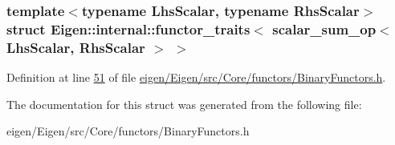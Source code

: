 \subsubsection*{template$<$typename Lhs\+Scalar, typename Rhs\+Scalar$>$\newline
struct Eigen\+::internal\+::functor\+\_\+traits$<$ scalar\+\_\+sum\+\_\+op$<$ Lhs\+Scalar, Rhs\+Scalar $>$ $>$}



Definition at line \hyperlink{eigen_2_eigen_2src_2_core_2functors_2_binary_functors_8h_source_l00051}{51} of file \hyperlink{eigen_2_eigen_2src_2_core_2functors_2_binary_functors_8h_source}{eigen/\+Eigen/src/\+Core/functors/\+Binary\+Functors.\+h}.



The documentation for this struct was generated from the following file\+:\begin{DoxyCompactItemize}
\item 
eigen/\+Eigen/src/\+Core/functors/\+Binary\+Functors.\+h\end{DoxyCompactItemize}
